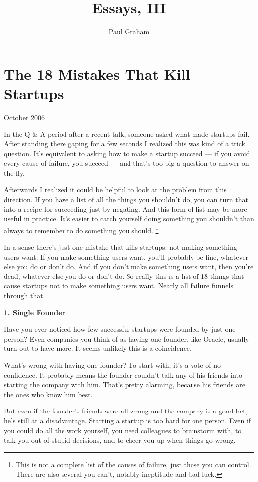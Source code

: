 \documentclass[12pt]{book}
\title{Essays, III}
\author{Paul Graham}
\date{}
\begin{document}
\frontmatter
\maketitle
\tableofcontents
\clearpage
\mainmatter

\chapter{The 18 Mistakes That Kill Startups}

October 2006

In the Q \& A period after a recent talk, someone asked what made
startups fail. After standing there gaping for a few seconds I realized
this was kind of a trick question. It's equivalent to asking how to make
a startup succeed --- if you avoid every cause of failure, you succeed
--- and that's too big a question to answer on the fly.

Afterwards I realized it could be helpful to look at the problem from
this direction. If you have a list of all the things you shouldn't do,
you can turn that into a recipe for succeeding just by negating. And
this form of list may be more useful in practice. It's easier to catch
yourself doing something you shouldn't than always to remember to do
something you should. \footnote{This is not a complete list of the causes of failure, just those
you can control. There are also several you can't, notably ineptitude
and bad luck.}

In a sense there's just one mistake that kills startups: not making
something users want. If you make something users want, you'll probably
be fine, whatever else you do or don't do. And if you don't make
something users want, then you're dead, whatever else you do or don't
do. So really this is a list of 18 things that cause startups not to
make something users want. Nearly all failure funnels through that.

\textbf{1. Single Founder}

Have you ever noticed how few successful startups were founded by just
one person? Even companies you think of as having one founder, like
Oracle, usually turn out to have more. It seems unlikely this is a
coincidence.

What's wrong with having one founder? To start with, it's a vote of no
confidence. It probably means the founder couldn't talk any of his
friends into starting the company with him. That's pretty alarming,
because his friends are the ones who know him best.

But even if the founder's friends were all wrong and the company is a
good bet, he's still at a disadvantage. Starting a startup is too hard
for one person. Even if you could do all the work yourself, you need
colleagues to brainstorm with, to talk you out of stupid decisions, and
to cheer you up when things go wrong.
\end{document}
